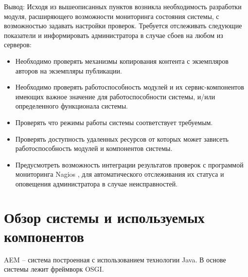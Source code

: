 Вывод:
Исходя из вышеописанных пунктов возникла необходимость разработки модуля, расширяющего возможности мониторинга состояния системы, с возможностью задавать настройки проверок. Требуется отслеживать следующие показатели и информировать администратора в случае сбоев на любом из серверов:
\begin{itemize} 
\item Необходимо проверять механизмы копирования контента с экземпляров авторов на экземпляры публикации.
\item Необходимо проверять работоспособность модулей и их сервис-компонентов имеющих важное значение для работоспособности системы, и/или определенного функционала системы.
\item Проверять что режимы работы системы соответствует требуемым. 
\item Проверять доступность удаленных ресурсов от которых может зависеть работоспособность модулей и компонентов системы.
\item Предусмотреть возможность интеграции результатов проверок с программой мониторинга Nagios \cite{web:nagiosDocs}, для автоматического отслеживания их статуса и оповещения администратора в случае неисправностей.
\end{itemize}

%
%

\section{Обзор системы и используемых компонентов}

AEM – система построенная с использованием технологии Java. В основе системы лежит фреймворк OSGI.

